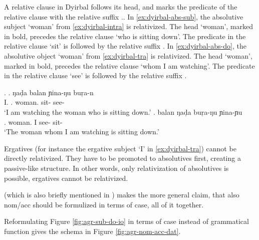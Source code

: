 A relative clause in Dyirbal follows its head, and marks the predicate of the relative clause with the relative suffix ..
In \ref{ex:dyirbal-abs-sub}, the absolutive subject  `woman' from \ref{ex:dyirbal-intra} is relativized. The head  `woman', marked in bold, precedes the relative clause  `who is sitting down'. The predicate in the relative clause  `sit' is followed by the relative suffix .
In \ref{ex:dyirbal-abs-do}, the absolutive object  `woman' from \ref{ex:dyirbal-tra} is relativized. The head  `woman', marked in bold, precedes the relative clause  `whom I am watching'. The predicate in the relative clause  `see' is followed by the relative suffix .

\ex.
\ag. ŋad̦a balan  ɲina-ŋu buŗa-n\\
 I. . woman. sit- see-\\
 `I am watching the woman who is sitting down.'\label{ex:dyirbal-abs-sub}
\bg. balan  ŋad̦a buŗa-ŋu ɲina-ɲu\\
 . woman. I see- sit-\\
 `The woman whom I am watching is sitting down.'\label{ex:dyirbal-abs-do}

Ergatives (for instance the ergative subject  `I' in \ref{ex:dyirbal-tra}) cannot be directly relativized. They have to be promoted to absolutives first, creating a passive-like structure. In other words, only relativization of absolutives is possible, ergatives cannot be relativized.


\citet{caha2009} (which is also briefly mentioned in \citealt{bobaljik2006}) makes the more general claim, that also nom/acc should be formulized in terms of case, all of it together.

Reformulating Figure \ref{fig:agr-sub-do-io} in terms of case instead of grammatical function gives the schema in Figure \ref{fig:agr-nom-acc-dat}.

